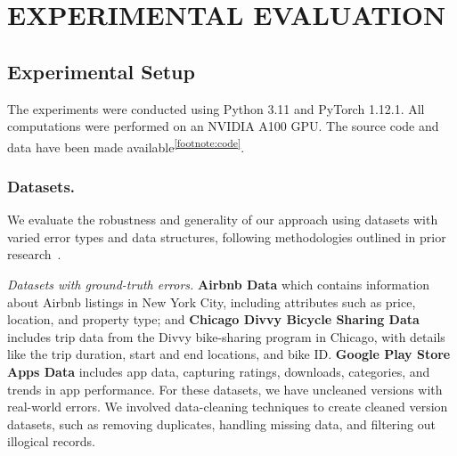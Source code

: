 \section{EXPERIMENTAL EVALUATION}

\subsection{Experimental Setup}
The experiments were conducted using Python 3.11 and PyTorch 1.12.1. All computations were performed on an NVIDIA A100 GPU. The source code and data have been made available\textsuperscript{\ref{footnote:code}}.



\subsubsection{Datasets.} We evaluate the robustness and generality of our approach using datasets with varied error types and data structures, following methodologies outlined in prior research~\cite{redyuk2021automating}.

\noindent \textit{Datasets with ground-truth errors.}
\textbf{Airbnb Data\cite{airbnb}} which contains information about Airbnb listings in New York City, including attributes such as price, location, and property type; and
\textbf{Chicago Divvy Bicycle Sharing Data\cite{divvy}} includes trip data from the Divvy bike-sharing program in Chicago, with details like the trip duration, start and end locations, and bike ID. 
\textbf{Google Play Store Apps Data\cite{google_play}} includes app data, capturing ratings, downloads, categories, and trends in app performance.
For these datasets, we have uncleaned versions with real-world errors.
We involved data-cleaning techniques to create cleaned version datasets, such as removing duplicates, handling missing data, and filtering out illogical records.



